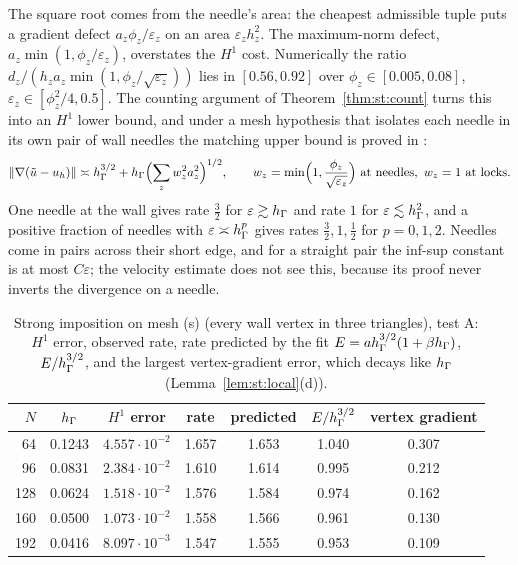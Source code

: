 The square root comes from the needle's area: the cheapest admissible tuple puts a gradient defect $a_z\phi_z/\varepsilon_z$ on an area $\varepsilon_zh_z^2$. The maximum-norm defect, $a_z\min(1,\phi_z/\varepsilon_z)$, overstates the $H^1$ cost. Numerically the ratio $d_z/(h_za_z\min(1,\phi_z/\sqrt{\varepsilon_z}))$ lies in $[0.56,0.92]$ over $\phi_z\in[0.005,0.08]$, $\varepsilon_z\in[\phi_z^2/4,0.5]$. The counting argument of Theorem~\ref{thm:st:count} turns this into an $H^1$ lower bound, and under a mesh hypothesis that isolates each needle in its own pair of wall needles the matching upper bound is proved in \cite{PadhiExt}:
\[
\lVert \nabla(\tilde u-u_h)\rVert\asymp h_\Gamma^{3/2}+h_\Gamma\Bigl(\sum_zw_z^2a_z^2\Bigr)^{1/2},\qquad w_z=\min\Bigl(1,\frac{\phi_z}{\sqrt{\varepsilon_z}}\Bigr)\ \text{at needles},\ w_z=1\ \text{at locks}.
\]
One needle at the wall gives rate $\frac32$ for $\varepsilon\gtrsim h_\Gamma$ and rate $1$ for $\varepsilon\lesssim h_\Gamma^2$, and a positive fraction of needles with $\varepsilon\asymp h_\Gamma^p$ gives rates $\frac32,1,\frac12$ for $p=0,1,2$. Needles come in pairs across their short edge, and for a straight pair the inf-sup constant is at most $C\varepsilon$; the velocity estimate does not see this, because its proof never inverts the divergence on a needle.

\begin{table}[t]
\centering\small
\caption{Strong imposition on mesh (s) (every wall vertex in three triangles), test A: $H^1$ error, observed rate, rate predicted by the fit $E=ah_\Gamma^{3/2}(1+\beta h_\Gamma)$, $E/h_\Gamma^{3/2}$, and the largest vertex-gradient error, which decays like $h_\Gamma$ (Lemma~\ref{lem:st:local}(d)).}\label{tab:drift}
\begin{tabular}{rcccccc}
\toprule
$N$ & $h_\Gamma$ & $H^1$ error & rate & predicted & $E/h_\Gamma^{3/2}$ & vertex gradient\\
\midrule
64 & 0.1243 & $4.557\cdot10^{-2}$ & 1.657 & 1.653 & 1.040 & 0.307\\
96 & 0.0831 & $2.384\cdot10^{-2}$ & 1.610 & 1.614 & 0.995 & 0.212\\
128 & 0.0624 & $1.518\cdot10^{-2}$ & 1.576 & 1.584 & 0.974 & 0.162\\
160 & 0.0500 & $1.073\cdot10^{-2}$ & 1.558 & 1.566 & 0.961 & 0.130\\
192 & 0.0416 & $8.097\cdot10^{-3}$ & 1.547 & 1.555 & 0.953 & 0.109\\
\bottomrule
\end{tabular}
\end{table}

